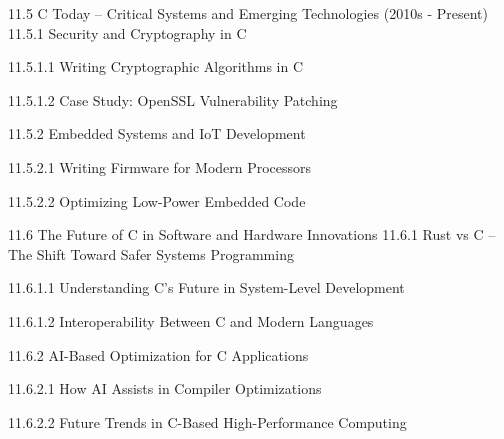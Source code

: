 11.5 C Today – Critical Systems and Emerging Technologies (2010s - Present)
11.5.1 Security and Cryptography in C

11.5.1.1 Writing Cryptographic Algorithms in C

11.5.1.2 Case Study: OpenSSL Vulnerability Patching

11.5.2 Embedded Systems and IoT Development

11.5.2.1 Writing Firmware for Modern Processors

11.5.2.2 Optimizing Low-Power Embedded Code

11.6 The Future of C in Software and Hardware Innovations
11.6.1 Rust vs C – The Shift Toward Safer Systems Programming

11.6.1.1 Understanding C’s Future in System-Level Development

11.6.1.2 Interoperability Between C and Modern Languages

11.6.2 AI-Based Optimization for C Applications

11.6.2.1 How AI Assists in Compiler Optimizations

11.6.2.2 Future Trends in C-Based High-Performance Computing

